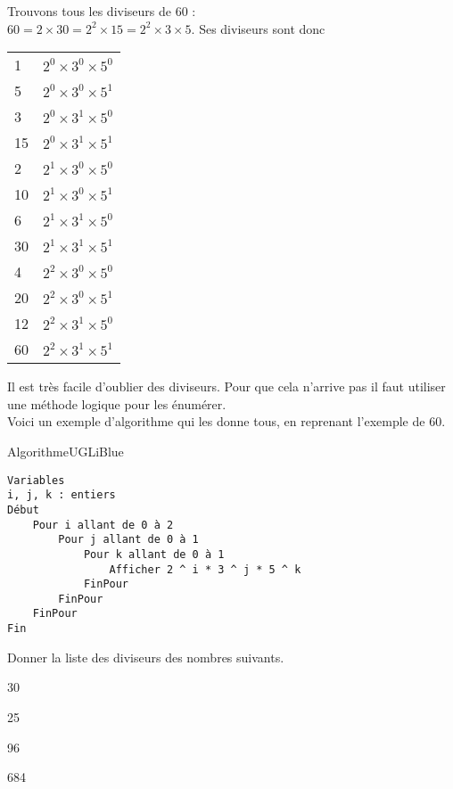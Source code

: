 \begin{exemple}[]
	Trouvons tous les diviseurs de 60 : \\
	$60=2\times30=2^2\times 15=2^2\times 3\times 5$.
	Ses diviseurs sont donc \\
	
	\begin{tabular}{l|l}
		1  & $2^0\times 3^0\times 5^0$ \\
		5  & $2^0\times 3^0\times 5^1$ \\
		3  & $2^0\times 3^1\times 5^0$ \\
		15 & $2^0\times 3^1\times 5^1$ \\
		2  & $2^1\times 3^0\times 5^0$ \\
		10 & $2^1\times 3^0\times 5^1$ \\
		6  & $2^1\times 3^1\times 5^0$ \\
		30 & $2^1\times 3^1\times 5^1$ \\
		4  & $2^2\times 3^0\times 5^0$ \\
		20 & $2^2\times 3^0\times 5^1$ \\
		12 & $2^2\times 3^1\times 5^0$ \\
		60 & $2^2\times 3^1\times 5^1$ \\
	\end{tabular}
\end{exemple}

Il est très facile d'oublier des diviseurs. Pour que cela n'arrive pas il faut utiliser une méthode logique pour les énumérer.\\
Voici un exemple d'algorithme qui les donne tous, en reprenant l'exemple de 60.

\begin{encadrecolore}{Algorithme}{UGLiBlue}
	\begin{verbatim}
Variables
i, j, k : entiers
Début
    Pour i allant de 0 à 2
        Pour j allant de 0 à 1
            Pour k allant de 0 à 1
                Afficher 2 ^ i * 3 ^ j * 5 ^ k
            FinPour
        FinPour
    FinPour
Fin
\end{verbatim}
\end{encadrecolore}

\begin{exercice}[]
	
	Donner la liste des diviseurs des nombres suivants.
	
	\begin{multicols}{2}
		\begin{enumalph}
			\item 30
			\item 25
			\item 96
			\item 684
		\end{enumalph}
	\end{multicols}
	
\end{exercice}


